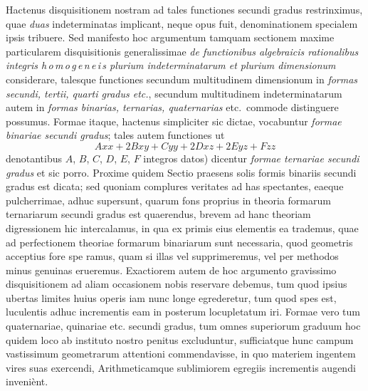 Hactenus disquisitionem nostram ad tales functiones secundi gradus restrinximus,
quae \textit{duas} indeterminatas implicant, neque opus fuit, denominationem
specialem ipsis tribuere. Sed manifesto hoc argumentum tamquam sectionem
maxime particularem disquisitionis generalissimae \textit{de functionibus algebraicis
rationalibus integris h\,o\,m\,o\,g\,e\,n\,e\,i\,s plurium indeterminatarum et plurium dimensionum}
considerare, talesque functiones secundum multitudinem dimensionum in \textit{formas
secundi, tertii, quarti gradus etc.}, secundum multitudinem indeterminatarum autem
in \textit{formas binarias, ternarias, quaternarias} etc.\ commode distinguere possumus.
Formae itaque, hactenus simpliciter sic dictae, vocabuntur \textit{formae binariae
secundi gradus}; tales autem functiones ut
\[
Axx+2Bxy+Cyy+2Dxz+2Eyz+Fzz
\]
denotantibus $A$, $B$, $C$, $D$, $E$, $F$ integros datos) dicentur \textit{formae ternariae secundi
gradus} et sic porro. Proxime quidem Sectio praesens solis formis binariis secundi
gradus est dicata; sed quoniam complures veritates ad has spectantes, eaeque pulcherrimae,
adhuc supersunt, quarum fons proprius in theoria formarum ternariarum
secundi gradus est quaerendus, brevem ad hanc theoriam digressionem hic intercalamus,
in qua ex primis eius elementis ea trademus, quae ad perfectionem
theoriae formarum binariarum sunt necessaria, quod geometris acceptius fore spe%
%
ramus, quam si illas vel supprimeremus, vel per methodos minus genuinas erueremus.
Exactiorem autem de hoc argumento gravissimo disquisitionem ad aliam
occasionem nobis reservare debemus, tum quod ipsius ubertas limites huius operis
iam nunc longe egrederetur, tum quod spes est, luculentis adhuc incrementis
eam in posterum locupletatum iri. Formae vero tum quaternariae, quinariae etc.
secundi gradus, tum omnes superiorum graduum hoc quidem loco ab instituto
nostro penitus excluduntur, sufficiatque hunc campum vastissimum geometrarum
attentioni commendavisse, in quo materiem ingentem vires suas exercendi,
Arithmeticamque sublimiorem egregiis incrementis augendi inveni\`ent.

